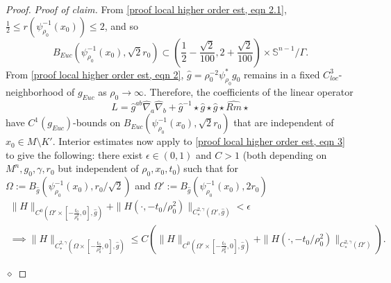 \documentclass[12pt]{amsart}
\renewcommand{\1}{{\mathbf 1}}
\newenvironment{claimproof}{\par\noindent\textit{Proof of claim.}\space}{\hfill$\diamond$\medskip\par}
\theoremstyle{others}
\numberwithin{equation}{section}
\begin{document}
\begin{proof}
\begin{claimproof}
        From \eqref{proof local higher order est, eqn 2.1}, $\frac12 \le r ( \psi_{\rho_0}^{-1}(x_0)) \le 2$, and so 
            $$B_{Euc}( \psi_{\rho_0}^{-1} (x_0) , \sqrt 2 r_0) \subset \left( \frac12 - \frac{\sqrt 2}{100}, 2 + \frac{\sqrt 2}{100}\right) \times \mathbb S^{n-1} / \Gamma .$$ 
        From \eqref{proof local higher order est, eqn 2}, $\hat g = \rho_0^{-2} \psi_{\rho_0}^* g_0$ remains in a fixed $C^3_{loc}$-neighborhood of $g_{Euc}$ as $\rho_0 \to \infty$.
        Therefore, the coefficients of the linear operator
            $$L = \hat g^{ab} \hat \nabla_a \hat \nabla_b + \hat g^{-1} \star \hat g \star \hat g \star \hat {Rm} \star  $$
        have $C^1(g_{Euc})$-bounds on $B_{Euc}( \psi_{\rho_0}^{-1} (x_0) , \sqrt 2 r_0) $ that are independent of $x_0 \in M \setminus K'$.
        Interior estimates \cite[Propositions C.3, C.4]{Stolarski25} now apply to \eqref{proof local higher order est, eqn 3} to give the following:
        there exist $\epsilon \in (0,1) $ and $ C > 1$ (both depending on $M^n , g_0, \gamma, r_0$ but independent of $\rho_0, x_0, t_0$) such that 
        for 
        $\Omega := B_{\hat g}( \psi_{\rho_0}^{-1} (x_0) , r_0/ \sqrt 2) $ and 
        $\Omega' := B_{\hat g}( \psi_{\rho_0}^{-1} (x_0) ,  2 r_0)$
        \begin{multline} \label{proof higher order est, eqn model interior est}
            \| H \|_{C^0 \left( \Omega' \times \left[ -\frac{t_0}{\rho_0^2}, 0\right] ,  \hat g \right)} +  \| H(\cdot, -t_0/\rho_0^2) \|_{C^{2, \gamma}_*( \Omega' , \hat g )} < \epsilon \\
            \implies \| H \|_{C^{2, \gamma}_* \left( \Omega \times \left[ -\frac{t_0}{\rho_0^2}, 0\right] ,  \hat g \right) }
            \le C \left(  \| H \|_{C^0 \left( \Omega' \times \left[ -\frac{t_0}{\rho_0^2}, 0\right] ,  \hat g \right) } + \| H(\cdot, -t_0/\rho_0^2) \|_{C^{2, \gamma}_*(\Omega')} \right).
        \end{multline}
    

\end{claimproof}
\end{proof}
\end{document}
